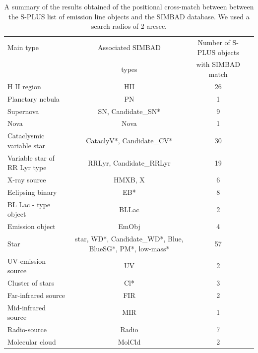 \documentclass[fleqn,usenatbib]{mnras}
\begin{document}
{\begin{table}
\centering
\caption{A summary of the results obtained of the positional cross-match between
         between the S-PLUS list of emission line objects and the SIMBAD database.
          We used a search radios of 2 arcsec. 
                                               }
\label{tab:simbad-sources}
\begin{tabular}{lccc} %
  \hline
Main type    & Associated SIMBAD           & Number of S-PLUS objects    \\
             & types                        &  with SIMBAD match         \\
\hline
H II region                & HII                     & 26                \\
Planetary nebula           & PN                      & 1                 \\
Supernova                  & SN, Candidate\_SN*      & 9                 \\
Nova                       & Nova                    & 1                 \\
Cataclysmic variable star  & CataclyV*, Candidate\_CV* & 30              \\
Variable star of RR Lyr type & RRLyr, Candidate\_RRLyr & 19              \\
X-ray source                & HMXB, X                  & 6               \\
Eclipsing binary            & EB*                    & 8                 \\            
BL Lac - type object        & BLLac                  & 2                 \\
Emission object             & EmObj                  & 4                 \\
Star                        & star, WD*, Candidate\_WD*, Blue, BlueSG*, PM*, low-mass* & 57 \\
UV-emission source          & UV                     & 2                 \\
Cluster of stars            & Cl*                    & 3                 \\
Far-infrared source         & FIR                    & 2                 \\
Mid-infrared source         & MIR                    & 1                 \\
Radio-source                & Radio                  & 7                 \\
Molecular cloud             & MolCld                 & 2                 \\

\end{tabular}
\end{table}}
\end{document}
